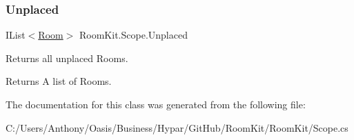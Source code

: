 \subsubsection{\texorpdfstring{Unplaced}{Unplaced}}
{\footnotesize\ttfamily I\+List$<$\mbox{\hyperlink{class_room_kit_1_1_room}{Room}}$>$ Room\+Kit.\+Scope.\+Unplaced\hspace{0.3cm}{\ttfamily [get]}}



Returns all unplaced Rooms. 

\begin{DoxyReturn}{Returns}
A list of Rooms. 
\end{DoxyReturn}


The documentation for this class was generated from the following file\+:\begin{DoxyCompactItemize}
\item 
C\+:/\+Users/\+Anthony/\+Oasis/\+Business/\+Hypar/\+Git\+Hub/\+Room\+Kit/\+Room\+Kit/Scope.\+cs\end{DoxyCompactItemize}
